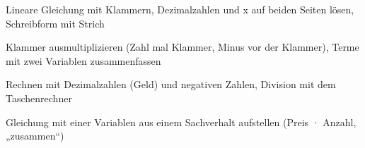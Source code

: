 \begin{aufgabe}{Lineare Gleichung mit Klammern, Dezimalzahlen und x auf beiden Seiten lösen, Schreibform mit Strich}
\end{aufgabe}

\begin{aufgabe}{Klammer ausmultiplizieren (Zahl mal Klammer, Minus vor der Klammer), Terme mit zwei Variablen zusammenfassen}
\end{aufgabe}

\begin{aufgabe}{Rechnen mit Dezimalzahlen (Geld) und negativen Zahlen, Division mit dem Taschenrechner}
\end{aufgabe}

\begin{aufgabe}{Gleichung mit einer Variablen aus einem Sachverhalt aufstellen (Preis · Anzahl, „zusammen“)}
\end{aufgabe}

